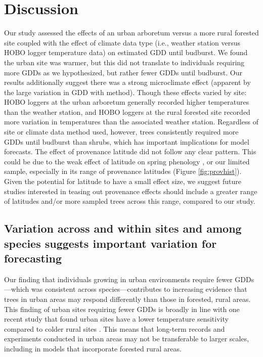 \documentclass{article}\usepackage[]{graphicx}\usepackage[]{color}
\begin{document}
\section*{Discussion} 
Our study assessed the effects of an urban arboretum versus a more rural forested site coupled with the effect of climate data type (i.e., weather station versus HOBO logger temperature data) on estimated GDD until budburst. We found the urban site was warmer, but this did not translate to individuals requiring more GDDs as we hypothesized, but rather fewer GDDs until budburst. Our results additionally suggest there was a strong microclimate effect (apparent by the large variation in GDD with method). Though these effects varied by site: HOBO loggers at the urban arboretum generally recorded higher temperatures than the weather station, and HOBO loggers at the rural forested site recorded more variation in temperatures than the associated weather station. Regardless of site or climate data method used, however, trees consistently required more GDDs until budburst than shrubs, which has important implications for model forecasts. The effect of provenance latitude did not follow any clear pattern. This could be due to the weak effect of latitude on spring phenology \citep{Gauzere2017}, or our limited sample, especially in its range of provenance latitudes (Figure \ref{fig:provhist}). Given the potential for latitude to have a small effect size, we suggest future studies interested in teasing out provenance effects should include a greater range of latitudes and/or more sampled trees across this range, compared to our study. 

\subsection*{Variation across and within sites and among species suggests important variation for forecasting} 
Our finding that individuals growing in urban environments require fewer GDDs---which was consistent across species---contributes to increasing evidence that trees in urban areas may respond differently than those in forested, rural areas. This finding of urban sites requiring fewer GDDs is broadly in line with one recent study that found urban sites have a lower temperature sensitivity compared to colder rural sites \citep{Meng2020}. This means that long-term records and experiments conducted in urban areas may not be transferable to larger scales, including in models that incorporate forested rural areas. 
\end{document}
